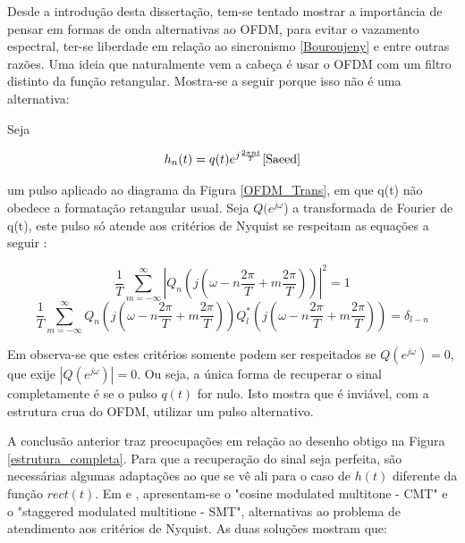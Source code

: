 \par Desde a introdução desta dissertação, tem-se tentado mostrar a importância de pensar em formas de onda alternativas ao OFDM, para evitar o vazamento espectral, ter-se liberdade em relação ao sincronismo \ref{Bouroujeny} e entre outras razões. Uma ideia que naturalmente vem a cabeça é usar o OFDM com um filtro distinto da função retangular. Mostra-se a seguir porque isso não é uma alternativa: 

Seja

\begin{equation} \label{OFDM_pulso}
h_{n}(t) = q(t)e^{j\frac{2\pi nt}{T}} \cite{Saeed}
\end{equation}

um pulso aplicado ao diagrama da Figura \ref{OFDM_Trans}, em que q(t) não obedece a formatação retangular usual. Seja $Q(e^{j\omega}$) a transformada de Fourier de q(t), este pulso só atende aos critérios de Nyquist se respeitam as equações a seguir \cite{Saeed}: 

\begin{equation}
\frac{1}{T}\sum_{m = -\infty}^{\infty}|Q_{n}(j(\omega -n \frac{2 \pi}{T} + m \frac{2 \pi}{T}))|^{2} = 1
\end{equation}
\begin{equation}
\frac{1}{T}\sum_{m = -\infty}^{\infty}Q_{n}(j(\omega -n \frac{2 \pi}{T} + m \frac{2 \pi}{T}))Q_{l}^{*}(j(\omega -n \frac{2 \pi}{T} + m \frac{2 \pi}{T})) = \delta_{l-n} 
\end{equation}

\par Em \cite{Saeed} observa-se que estes critérios somente podem ser respeitados se $Q(e^{j\omega}) = 0$, que exije $|Q(e^{j\omega})| = 0$. Ou seja, a única forma de recuperar o sinal completamente é se o pulso $q(t)$ for nulo. Isto mostra que é inviável, com a estrutura crua do OFDM, utilizar um pulso alternativo. 
\par A conclusão anterior traz preocupações em relação ao desenho obtigo na Figura \ref{estrutura_completa}. Para que a recuperação do sinal seja perfeita, são necessárias algumas adaptações ao que se vê ali para o caso de $h(t)$ diferente da função $rect(t)$. Em \cite{Boroujeny2} e \cite{Bellanger}, apresentam-se o "cosine modulated multitone - CMT" e o "staggered modulated multitione - SMT", alternativas ao problema de atendimento aos critérios de Nyquist. As duas soluções mostram que:

